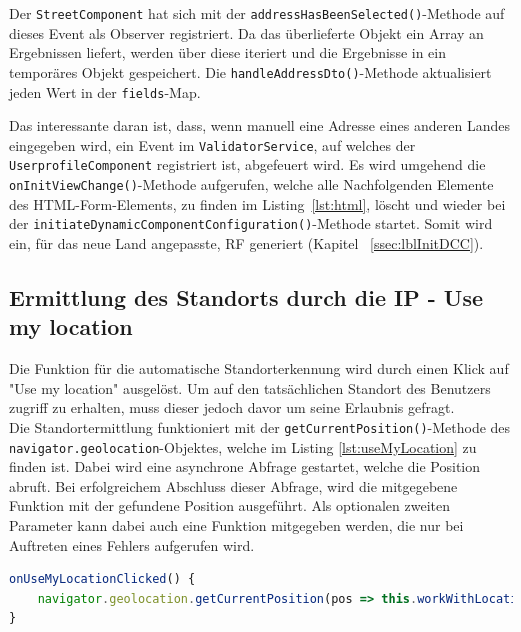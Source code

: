 Der \texttt{StreetComponent} hat sich mit der \texttt{addressHasBeenSelected()}-Methode auf dieses Event als Observer registriert. Da das überlieferte Objekt ein Array an Ergebnissen liefert, werden über diese iteriert und die Ergebnisse in ein temporäres Objekt gespeichert. Die \texttt{handleAddressDto()}-Methode aktualisiert jeden Wert in der \texttt{fields}-Map. 

Das interessante daran ist, dass, wenn manuell eine Adresse eines anderen Landes eingegeben wird, ein Event im \texttt{ValidatorService}, auf welches der \texttt{UserprofileComponent} registriert ist, abgefeuert wird. Es wird umgehend die \texttt{onInitViewChange()}-Methode aufgerufen, welche alle Nachfolgenden Elemente des HTML-Form-Elements, zu finden im Listing~\ref{lst:html}, löscht und wieder bei der \texttt{initiateDynamicComponentConfiguration()}-Methode startet. Somit wird ein, für das neue Land angepasste, RF generiert (Kapitel ~\ref{ssec:lblInitDCC}).


\subsection{Ermittlung des Standorts durch die IP - Use my location}

Die Funktion für die automatische Standorterkennung wird durch einen Klick auf "Use my location" ausgelöst. Um auf den tatsächlichen Standort des Benutzers zugriff zu erhalten, muss dieser jedoch davor um seine Erlaubnis gefragt.\autocite{useMyLocation}\\

Die Standortermittlung funktioniert mit der \texttt{getCurrentPosition()}-Methode des \\ \texttt{navigator.geolocation}-Objektes, welche im Listing \ref{lst:useMyLocation} zu finden ist. Dabei wird eine asynchrone Abfrage gestartet, welche die Position abruft. Bei erfolgreichem Abschluss dieser Abfrage, wird die mitgegebene Funktion mit der gefundene Position ausgeführt. Als optionalen zweiten Parameter kann dabei auch eine Funktion mitgegeben werden, die nur bei Auftreten eines Fehlers aufgerufen wird. \autocite{useMyLocation}

\begin{lstlisting}[caption={Die \texttt{onUseMyLocationClicked()}-Methode der \texttt{StreetComponent}-Klasse}, language=JavaScript,label={lst:useMyLocation}]
onUseMyLocationClicked() {
	navigator.geolocation.getCurrentPosition(pos => this.workWithLocation(pos, this));
}
\end{lstlisting}

